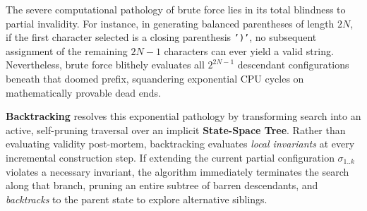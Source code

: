 \documentclass[10pt,journal,compsoc,onecolumn]{IEEEtran}
\begin{document}
The severe computational pathology of brute force lies in its total blindness to partial invalidity. For instance, in generating balanced parentheses of length $2N$, if the first character selected is a closing parenthesis \texttt{')'}, no subsequent assignment of the remaining $2N-1$ characters can ever yield a valid string. Nevertheless, brute force blithely evaluates all $2^{2N-1}$ descendant configurations beneath that doomed prefix, squandering exponential CPU cycles on mathematically provable dead ends.

\textbf{Backtracking} resolves this exponential pathology by transforming search into an active, self-pruning traversal over an implicit \textbf{State-Space Tree}. Rather than evaluating validity post-mortem, backtracking evaluates \textit{local invariants} at every incremental construction step. If extending the current partial configuration $\sigma_{1..k}$ violates a necessary invariant, the algorithm immediately terminates the search along that branch, pruning an entire subtree of barren descendants, and \textit{backtracks} to the parent state to explore alternative siblings.
\end{document}
